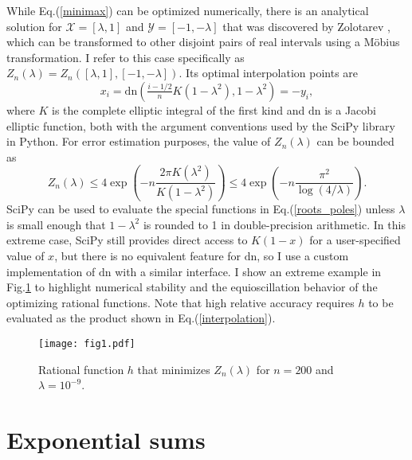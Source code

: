 \documentclass[12pt]{article}
\begin{document}
While Eq.\@ (\ref{minimax}) can be optimized numerically, there is an analytical solution for $\mathcal{X} = [\lambda,1]$ and $\mathcal{Y} = [-1,-\lambda]$ that was discovered by Zolotarev \cite{Todd1984},
 which can be transformed to other disjoint pairs of real intervals using a M\"{o}bius transformation.
I refer to this case specifically as $Z_n(\lambda) = Z_n([\lambda,1],[-1,-\lambda])$.
Its optimal interpolation points are
\begin{equation} \label{roots_poles}
 x_i = \mathrm{dn}\left( \tfrac{i - 1/2}{n} K(1-\lambda^2), 1 - \lambda^2 \right) = -y_i,
\end{equation}
 where $K$ is the complete elliptic integral of the first kind and $\mathrm{dn}$ is a Jacobi elliptic function, both with the argument conventions used by the SciPy library in Python.
For error estimation purposes, the value of $Z_n(\lambda)$ can be bounded as
\begin{equation}
 Z_n(\lambda) \le 4 \exp\left( - n \frac{2 \pi K(\lambda^2)}{K(1-\lambda^2)} \right) \le 4 \exp\left( - n \frac{\pi^2}{\log(4/\lambda)} \right).
\end{equation}
SciPy can be used to evaluate the special functions in Eq.\@ (\ref{roots_poles}) unless $\lambda$ is small enough that $1-\lambda^2$ is rounded to 1 in double-precision arithmetic.
In this extreme case, SciPy still provides direct access to $K(1-x)$ for a user-specified value of $x$, but there is no equivalent feature for $\mathrm{dn}$,
 so I use a custom implementation of $\mathrm{dn}$ with a similar interface.
I show an extreme example in Fig.\@ \ref{r_example} to highlight numerical stability and the equioscillation behavior of the optimizing rational functions.
Note that high relative accuracy requires $h$ to be evaluated as the product shown in Eq.\@ (\ref{interpolation}).

\begin{figure}
\texttt{[image: fig1.pdf]}
     \caption{Rational function $h$ that minimizes $Z_n(\lambda)$ for $n=200$ and $\lambda = 10^{-9}$.
}\label{r_example}
\end{figure}

\section{Exponential sums}
\end{document}
